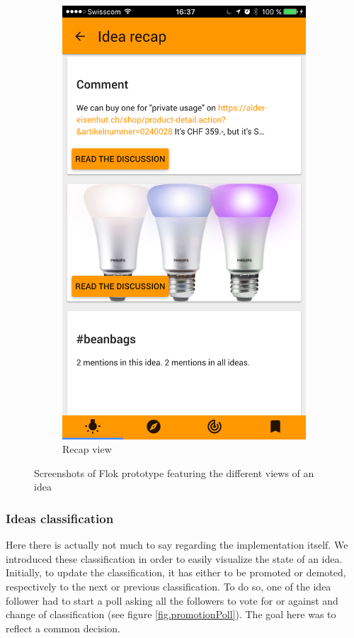 \documentclass[a4paper,12pt, oneside]{article}
\begin{document}
\begin{figure}[!htb]
\begin{subfigure}[t]{.32\textwidth}
        \includegraphics[width=\textwidth]{images/ideaRecap.png}
        \caption{Recap view}
        \label{fig.idea.recap}
    \end{subfigure}
    \caption{Screenshots of Flok prototype featuring the different views of an idea}
    \label{fig.idea}
\end{figure}

\subsubsection{Ideas classification}
\label{sec.ideasClassification}
Here there is actually not much to say regarding the implementation itself.
We introduced these classification in order to easily visualize the state of an idea.
Initially, to update the classification, it has either to be promoted or demoted, respectively to the next or previous classification.
To do so, one of the idea follower had to start a poll asking all the followers to vote for or against and change of classification (see figure \ref{fig.promotionPoll}).
The goal here was to reflect a common decision.
\end{document}
